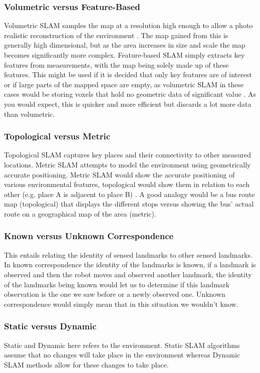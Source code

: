 					\subsubsection{Volumetric versus Feature-Based}
					Volumetric SLAM samples the map at a resolution high enough to allow a photo realistic reconstruction of the environment \citep{thrun2008simultaneous}. The map gained from this is generally high dimensional, but as the area increases in size and scale the map becomes significantly more complex. Feature-based SLAM simply extracts key features from measurements, with the map being solely made up of these features. This might be used if it is decided that only key features are of interest or if large parts of the mapped space are empty, as volumetric SLAM in these cases would be storing voxels that hold no geometric data of significant value \citep{vespa2018efficient}. As you would expect, this is quicker and more efficient but discards a lot more data than volumetric. 
					
					\subsubsection{Topological versus Metric}
					Topological SLAM captures key places and their connectivity to other measured locations. Metric SLAM attempts to model the environment using geometrically accurate positioning. Metric SLAM would show the accurate positioning of various environmental features, topological would show them in relation to each other (e.g. place A is adjacent to place B) \citep{thrun2008simultaneous}. A good analogy would be a bus route map (topological) that displays the different stops versus showing the bus' actual route on a geographical map of the area (metric).
					
					\subsubsection{Known versus Unknown Correspondence}
					This entails relating the identity of sensed landmarks to other sensed landmarks. In known correspondence the identity of the landmarks is known, if a landmark is observed and then the robot moves and observed another landmark, the identity of the landmarks being known would let us to determine if this landmark observation is the one we saw before or a newly observed one. Unknown correspondence would simply mean that in this situation we wouldn't know.	
					
					\subsubsection{Static versus Dynamic}
					Static and Dynamic here refers to the environment. Static SLAM algorithms assume that no changes will take place in the environment whereas Dynamic SLAM methods allow for these changes to take place.
					
